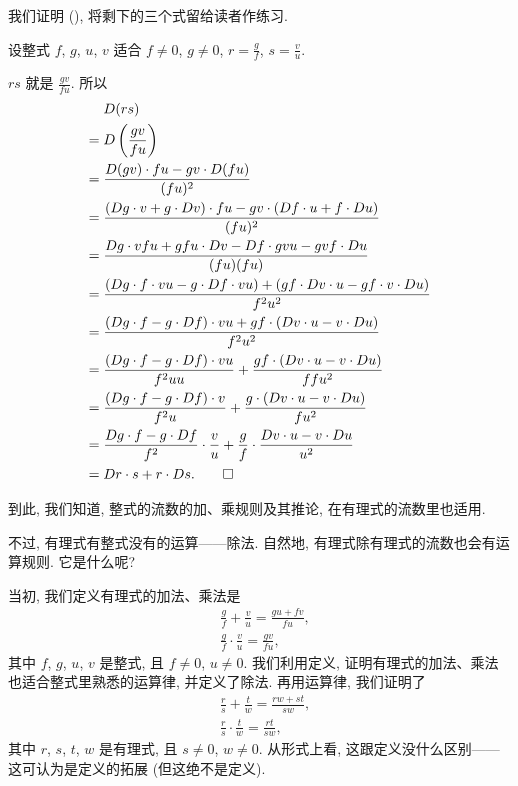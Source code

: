 \begin{pf}
    我们证明 (), 将剩下的三个式留给读者作练习.

    设整式 $f$, $g$, $u$, $v$ 适合 $f \neq 0$, $g \neq 0$, $r = \frac{g}{f}$, $s = \frac{v}{u}$.

    $rs$ 就是 $\frac{gv}{fu}$. 所以
    \begin{align*}
             & D(rs)                                                                                                         \\
        = {} & D \left( \frac{gv}{fu} \right)                                                                                \\
        = {} & \frac{D(gv) \cdot fu - gv \cdot D(fu)}{(fu)^2}                                                                \\
        = {} & \frac{(Dg \cdot v + g \cdot Dv) \cdot fu - gv \cdot (Df \cdot u + f \cdot Du)}{(fu)^2}                        \\
        = {} & \frac{Dg \cdot vfu + gfu \cdot Dv - Df \cdot gvu - gvf \cdot Du}{(fu)(fu)}                                    \\
        = {} & \frac{(Dg \cdot f \cdot vu - g \cdot Df \cdot vu) + (gf \cdot Dv \cdot u - gf \cdot v \cdot Du)}{f^2 u^2}     \\
        = {} & \frac{(Dg \cdot f - g \cdot Df) \cdot vu + gf \cdot (Dv \cdot u - v \cdot Du)}{f^2 u^2}                       \\
        = {} & \frac{(Dg \cdot f - g \cdot Df) \cdot vu}{f^2 uu} + \frac{gf \cdot (Dv \cdot u - v \cdot Du)}{ff u^2}         \\
        = {} & \frac{(Dg \cdot f - g \cdot Df) \cdot v}{f^2 u} + \frac{g \cdot (Dv \cdot u - v \cdot Du)}{f u^2}             \\
        = {} & \frac{Dg \cdot f - g \cdot Df}{f^2} \cdot \frac{v}{u} + \frac{g}{f} \cdot \frac{Dv \cdot u - v \cdot Du}{u^2} \\
        = {} & Dr \cdot s + r \cdot Ds. \qedhere
    \end{align*}
\end{pf}

到此, 我们知道, 整式的流数的加、乘规则及其推论, 在有理式的流数里也适用.

不过, 有理式有整式没有的运算——除法. 自然地, 有理式除有理式的流数也会有运算规则. 它是什么呢?

当初, 我们定义有理式的加法、乘法是
\begin{align*}
     & \frac{g}{f} + \frac{v}{u} = \frac{gu + fv}{fu}, \\
     & \frac{g}{f} \cdot \frac{v}{u} = \frac{gv}{fu},
\end{align*}
其中 $f$, $g$, $u$, $v$ 是整式, 且 $f \neq 0$, $u \neq 0$. 我们利用定义, 证明有理式的加法、乘法也适合整式里熟悉的运算律, 并定义了除法. 再用运算律, 我们证明了
\begin{align*}
     & \frac{r}{s} + \frac{t}{w} = \frac{rw + st}{sw}, \\
     & \frac{r}{s} \cdot \frac{t}{w} = \frac{rt}{sw},
\end{align*}
其中 $r$, $s$, $t$, $w$ 是有理式, 且 $s \neq 0$, $w \neq 0$. 从形式上看, 这跟定义没什么区别——这可认为是定义的拓展 (但这绝不是定义).

